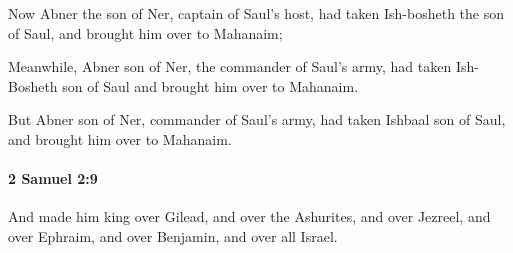 			\begin{versebox}
					\item[BHS] 
					\item[ASV] Now Abner the son of Ner, captain of Saul's host, had taken Ish-bosheth the son of Saul, and brought him over to Mahanaim;
					\item[NIV] Meanwhile, Abner son of Ner, the commander of Saul’s army, had taken Ish-Bosheth son of Saul and brought him over to Mahanaim.
					\item[NRSV] But Abner son of Ner, commander of Saul’s army, had taken Ishbaal son of Saul, and brought him over to Mahanaim.
			\end{versebox}

		\paragraph{2 Samuel 2:9} %
			\label{2SAMUEL-2-9}

			And made him king over Gilead, and over the Ashurites, and over Jezreel, and over Ephraim, and over Benjamin, and over all Israel.

